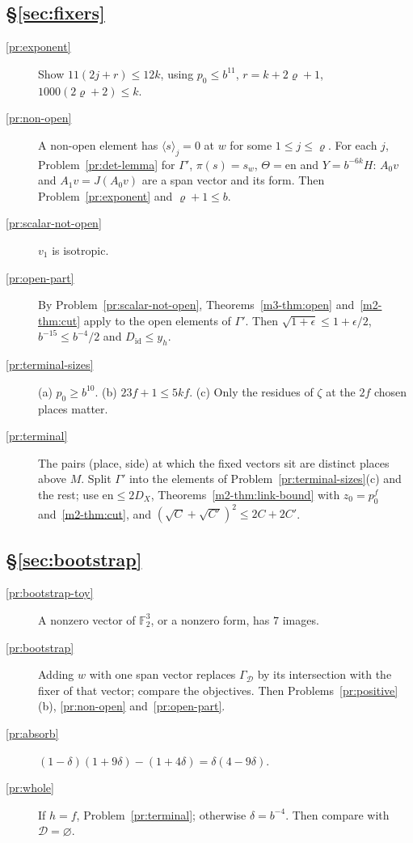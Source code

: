 \documentclass[reqno]{amsart}
\theoremstyle{definition}
\theoremstyle{plain}
\theoremstyle{remark}
\newcommand{\F}{\mathbb{F}}
\newcommand{\Dc}{\mathcal D}
\newcommand{\en}{\mathrm{en}}
\newcommand{\Did}{D_{\mathrm{id}}}
\begin{document}
\subsection*{\S\ref{sec:fixers}}
\begin{description}
\item[\ref{pr:exponent}] Show \(11(2j+r)\le12k\), using \(p_0\le b^{11}\), \(r=k+2\varrho+1\), \(1000(2\varrho+2)\le k\).
\item[\ref{pr:non-open}] A non-open element has \(\langle s\rangle_j=0\) at \(w\) for some \(1\le j\le\varrho\).  For each \(j\), Problem~\ref{pr:det-lemma} for \(\Gamma'\), \(\pi(s)=s_w\), \(\Theta=\en\) and \(Y=b^{-6k}H\): \(A_0v\) and \(A_1v=J(A_0v)\) are a span vector and its form.  Then Problem~\ref{pr:exponent} and \(\varrho+1\le b\).
\item[\ref{pr:scalar-not-open}] \(v_1\) is isotropic.
\item[\ref{pr:open-part}] By Problem~\ref{pr:scalar-not-open}, Theorems~\ref{m3-thm:open} and~\ref{m2-thm:cut} apply to the open elements of \(\Gamma'\).  Then \(\sqrt{1+\epsilon}\le1+\epsilon/2\), \(b^{-15}\le b^{-4}/2\) and \(\Did\le y_h\).
\item[\ref{pr:terminal-sizes}] (a) \(p_0\ge b^{10}\).  (b) \(23f+1\le5kf\).  (c) Only the residues of \(\zeta\) at the \(2f\) chosen places matter.
\item[\ref{pr:terminal}] The pairs (place, side) at which the fixed vectors sit are distinct places above \(M\).  Split \(\Gamma'\) into the elements of Problem~\ref{pr:terminal-sizes}(c) and the rest; use \(\en\le2D_X\), Theorems~\ref{m2-thm:link-bound} with \(z_0=p_0^f\) and~\ref{m2-thm:cut}, and \((\sqrt C+\sqrt{C'})^2\le2C+2C'\).
\end{description}

\subsection*{\S\ref{sec:bootstrap}}
\begin{description}
\item[\ref{pr:bootstrap-toy}] A nonzero vector of \(\F_2^3\), or a nonzero form, has \(7\) images.
\item[\ref{pr:bootstrap}] Adding \(w\) with one span vector replaces \(\Gamma_{\Dc}\) by its intersection with the fixer of that vector; compare the objectives.  Then Problems~\ref{pr:positive}(b), \ref{pr:non-open} and~\ref{pr:open-part}.
\item[\ref{pr:absorb}] \((1-\delta)(1+9\delta)-(1+4\delta)=\delta(4-9\delta)\).
\item[\ref{pr:whole}] If \(h=f\), Problem~\ref{pr:terminal}; otherwise \(\delta=b^{-4}\).  Then compare with \(\Dc=\varnothing\).
\end{description}
\end{document}
